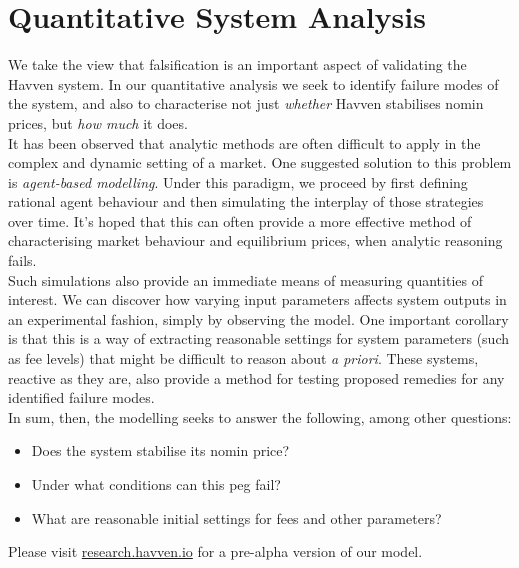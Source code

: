 \section{Quantitative System Analysis}

We take the view that falsification is an important aspect of validating
the Havven system. In our quantitative analysis we seek to identify failure modes
of the system, and also to characterise not just \textit{whether} Havven stabilises
nomin prices, but \textit{how much} it does. \\

\noindent It has been observed that analytic methods are often difficult to
apply in the complex and dynamic setting of a market.
One suggested solution to this problem is \textit{agent-based modelling}.
Under this paradigm, we proceed by first defining rational agent behaviour
and then simulating the interplay of those strategies over time.
It's hoped that this can often provide a more effective
method of characterising market behaviour and equilibrium prices,
when analytic reasoning fails.~\cite{poggio2001agent}\\

\noindent Such simulations also provide an immediate means of measuring
quantities of interest. We can discover how varying input parameters
affects system outputs in an experimental fashion, simply by observing
the model.
One important corollary is that this is a way of extracting reasonable
settings for system parameters (such as fee levels) that might be difficult
to reason about \textit{a priori}. These systems, reactive as they are,
also provide a method for testing proposed remedies for any identified failure
modes. \\

\noindent In sum, then, the modelling seeks to answer the following, among
other questions:

\begin{itemize}
    \item Does the system stabilise its nomin price?
    \item Under what conditions can this peg fail?
    \item What are reasonable initial settings for fees and other parameters?
\end{itemize}





\noindent Please visit \href{http://research.havven.io}{research.havven.io} for a pre-alpha version of our model.

\pagebreak
